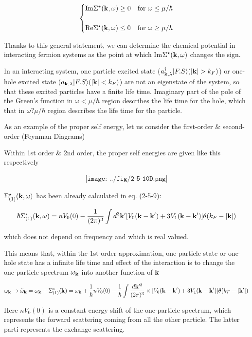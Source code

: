 \[\begin{cases}
\text{Im}\Sigma^\star({\bf k},\omega)\ge 0 &\text{for }\omega\le\mu/\hbar\\
& \\
\text{Re}\Sigma^\star({\bf k},\omega)\le 0 &\text{for }\omega\ge\mu/\hbar
\end{cases}\]

Thanks to this general statement, we can determine the chemical potential in interacting fermion systems as the point at which Im$\Sigma^\star({\bf k},\omega)$ changes the sign. 

In an interacting system, one particle excited state ($a^\dagger_{{\bf k},\lambda}|F.S\rangle (|{\bf k}|>k_F)$) or one-hole excited state ($a_{{\bf k},\lambda}|F.S\rangle (|{\bf k}|<k_F)$) are not an eigenstate of the system, so that these excited particles have a finite life time. Imaginary part of the pole of the Green's function in $\omega<\mu/\hbar$ region describes the life time for the hole, which that in $\omega?\mu/\hbar$ region describes the life time for the particle. 

As an example of the proper self energy, let us consider the first-order \& second-order (Feynman Diagrams)

Within 1st order \& 2nd order, the proper self energies are given like this respectively

\begin{align}
\texttt{[image: ../fig/2-5-10D.png]}
\end{align}

$\Sigma^\star_{(1)}({\bf k},\omega)$ has been already calculated in eq. (2-5-9):

\[\hbar\Sigma^\star_{(1)} ({\bf k},\omega) = nV_0(0)-\frac{1}{(2\pi)^3}\int d^3{\bf k}'[V_0({\bf k-k}')+3V_1({\bf k-k}')]\theta(k_F-|\bf k|) \]

which does not depend on frequency and which is real valued. 

This means that, within the 1st-order approximation, one-particle state or one-hole state has a infinite life time and effect of the interaction is to change the one-particle spectrum $\omega_{\bf k}$ into another function of $\bf k$

\[\omega_{\bf k}\to\tilde{\omega}_{\bf k} = \omega_{\bf k} + \Sigma^\star_{(1)}({\bf k})=\omega_{\bf k} + \frac{1}{\hbar}nV_0(0) - \frac{1}{\hbar}\int \frac{d{\bf k}'^3}{(2\pi)^3}\times[V_0({\bf k-k}')+3V_1({\bf k-k}')]\theta(k_F-|\bf k'|) \]

Here $nV_0(0)$ is a constant energy shift of the one-particle spectrum, which represents the forward scattering coming from all the other particle. The latter parti represents the exchange scattering. 

